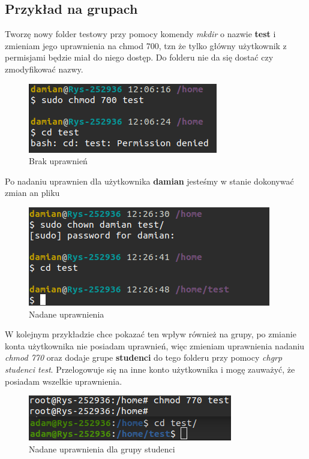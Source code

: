 \documentclass{article}
\begin{document}
\subsection{Przykład na grupach}
Tworzę nowy folder testowy przy pomocy komendy \textit{mkdir} o nazwie
\textbf{test} i zmieniam jego uprawnienia na chmod 700, tzn że tylko 
główny użytkownik z permisjami będzie miał do niego dostęp. Do folderu nie da
się dostać czy zmodyfikować nazwy.
\begin{figure}[H]
    \centering
    \includegraphics[totalheight=3cm]{data/chmod.png}
    \caption{Brak uprawnień }
    \label{2}
\end{figure}
Po nadaniu uprawnien dla użytkownika \textbf{damian} jesteśmy w stanie dokonywać zmian an pliku
\begin{figure}[H]
    \centering
    \includegraphics[totalheight=3cm]{data/chmod1.png}
    \caption{Nadane uprawnienia }
    \label{2}
\end{figure}
W kolejnym przykładzie chce pokazać ten wpływ również na grupy, po zmianie
konta użytkownika nie posiadam uprawnień, więc zmieniam uprawnienia nadaniu
\textit{chmod 770} oraz dodaje grupe \textbf{studenci} do tego folderu przy pomocy
\textit{chgrp studenci test}. Przelogowuje się na inne konto użytkownika i mogę zauważyć, że
posiadam wszelkie uprawnienia.

\begin{figure}[H]
    \centering
    \includegraphics[totalheight=3cm]{data/chmod3.png}
    \caption{Nadane uprawnienia dla grupy studenci}
    \label{2}
\end{figure}
\end{document}
